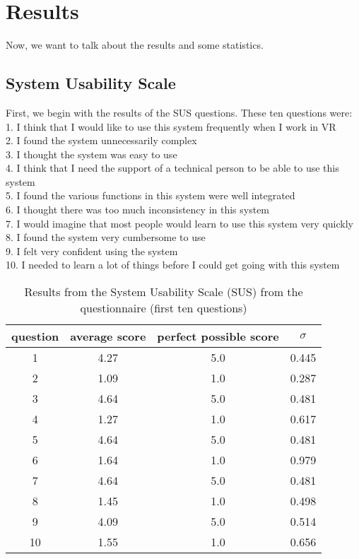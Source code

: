 \section{Results}
Now, we want to talk about the results and some statistics.\\

\subsection{System Usability Scale}
First, we begin with the results of the SUS questions. These ten questions were:\\
1. I think that I would like to use this system frequently when I work in VR\\
2. I found the system unnecessarily complex\\
3. I thought the system was easy to use \\
4. I think that I need the support of a technical person to be able to use this system\\
5. I found the various functions in this system were well integrated\\
6. I thought there was too much inconsistency in this system\\
7. I would imagine that most people would learn to use this system very quickly\\
8. I found the system very cumbersome to use\\
9. I felt very confident using the system\\
10. I needed to learn a lot of things before I could get going with this system
\begin{table}[ht!]
    \centering
    \begin{tabular}{cccc} \toprule
        question&average score&perfect possible score&$\sigma$\\ \midrule
        1 & 4.27 & 5.0 & 0.445\\ 
        2 & 1.09 & 1.0 & 0.287\\
        3 & 4.64 & 5.0 & 0.481\\ 
        4 & 1.27 & 1.0 & 0.617\\
        5 & 4.64 & 5.0 & 0.481\\
        6 & 1.64 & 1.0 & 0.979\\
        7 & 4.64 & 5.0 & 0.481\\
        8 & 1.45 & 1.0 & 0.498\\
        9 & 4.09 & 5.0 & 0.514\\
        10 & 1.55 & 1.0 & 0.656\\
        \bottomrule
    \end{tabular}
    \caption{Results from the System Usability Scale (SUS) from the questionnaire (first ten questions)}
    \label{tab:table}
\end{table}

